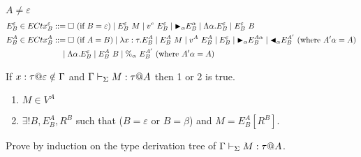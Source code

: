$A \neq \varepsilon$\\
\begin{align*}
	E^\varepsilon_B \in ECtx^\varepsilon_B & ::= \square\ (\text{if\ } B = \varepsilon) \mid E^\varepsilon_B\ M \mid v^e\ E^\varepsilon_B 
	\mid {\mathop{\blacktriangleright}}_\alpha E^\alpha_B \mid \Lambda\alpha.E^\varepsilon_B
	\mid E^\varepsilon_B\ B                                                                                                     \\
	E^A_B \in ECtx^A_B                     & ::= \square\ (\text{if } A = B) \mid \lambda x:\tau.E^A_B \mid E^A_B\ M \mid v^A\ E^A_B      
	\mid E^\varepsilon_B \mid {\mathop{\blacktriangleright}}_\alpha E^{A\alpha}_B
	\mid {\mathop{\blacktriangleleft}}_\alpha E^{A'}_B \ (\text{where } A'\alpha = A)                                                                              \\
	                                       & \quad \mid \Lambda\alpha.E^\varepsilon_B                                                     
	\mid E^A_B\ B \mid \%_\alpha\ E^{A'}_B \ (\text{where } A'\alpha = A)                                                       \\
\end{align*}

\begin{lemma}
	If $x:\tau@\varepsilon \notin \G$ and $\Gamma \vdash_\Sigma M : \tau @ A$ then 1 or 2 is true.
	\begin{enumerate}
		\item $ M \in V^A$
		\item $\exists ! B, E^A_B, R^B$ such that ($B = \varepsilon$ or $B = \beta$) and $M = E^A_B[R^B]$.
	\end{enumerate}
\end{lemma}

Prove by induction on the type derivation tree of $\G \V M:\tau@A$.

